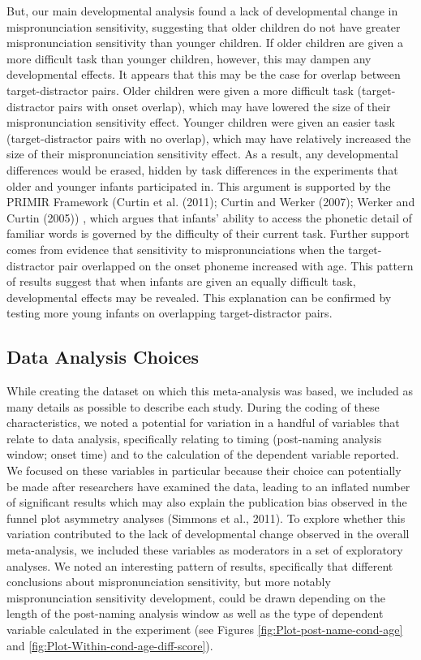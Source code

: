 \documentclass[man]{apa6}
\begin{document}
But, our main developmental analysis found a lack of developmental change in mispronunciation sensitivity, suggesting that older children do not have greater mispronunciation sensitivity than younger children. If older children are given a more difficult task than younger children, however, this may dampen any developmental effects. It appears that this may be the case for overlap between target-distractor pairs. Older children were given a more difficult task (target-distractor pairs with onset overlap), which may have lowered the size of their mispronunciation sensitivity effect. Younger children were given an easier task (target-distractor pairs with no overlap), which may have relatively increased the size of their mispronunciation sensitivity effect. As a result, any developmental differences would be erased, hidden by task differences in the experiments that older and younger infants participated in. This argument is supported by the PRIMIR Framework (Curtin et al. (2011); Curtin and Werker (2007); Werker and Curtin (2005)) , which argues that infants' ability to access the phonetic detail of familiar words is governed by the difficulty of their current task. Further support comes from evidence that sensitivity to mispronunciations when the target-distractor pair overlapped on the onset phoneme increased with age. This pattern of results suggest that when infants are given an equally difficult task, developmental effects may be revealed. This explanation can be confirmed by testing more young infants on overlapping target-distractor pairs.

\hypertarget{data-analysis-choices}{%
\subsection{Data Analysis Choices}\label{data-analysis-choices}}

While creating the dataset on which this meta-analysis was based, we included as many details as possible to describe each study. During the coding of these characteristics, we noted a potential for variation in a handful of variables that relate to data analysis, specifically relating to timing (post-naming analysis window; onset time) and to the calculation of the dependent variable reported. We focused on these variables in particular because their choice can potentially be made after researchers have examined the data, leading to an inflated number of significant results which may also explain the publication bias observed in the funnel plot asymmetry analyses (Simmons et al., 2011). To explore whether this variation contributed to the lack of developmental change observed in the overall meta-analysis, we included these variables as moderators in a set of exploratory analyses. We noted an interesting pattern of results, specifically that different conclusions about mispronunciation sensitivity, but more notably mispronunciation sensitivity development, could be drawn depending on the length of the post-naming analysis window as well as the type of dependent variable calculated in the experiment (see Figures \ref{fig:Plot-post-name-cond-age} and \ref{fig:Plot-Within-cond-age-diff-score}).
\end{document}

